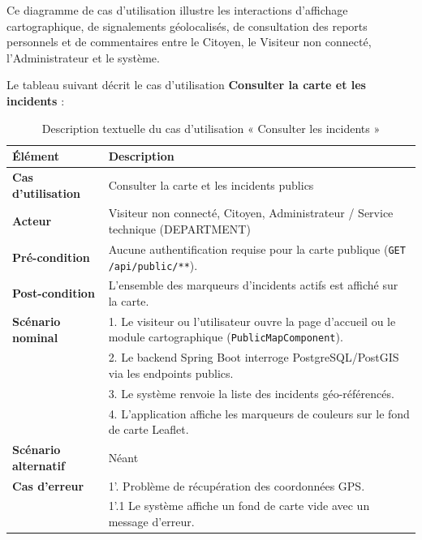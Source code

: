 Ce diagramme de cas d'utilisation illustre les interactions d'affichage cartographique, de signalements géolocalisés, de consultation des reports personnels et de commentaires entre le Citoyen, le Visiteur non connecté, l'Administrateur et le système.

Le tableau suivant décrit le cas d'utilisation \textbf{\og Consulter la carte et les incidents \fg{}} :

\begin{table}[H]
    \centering
    \caption{Description textuelle du cas d'utilisation « Consulter les incidents »}
    \label{tab:txt_cons_offres}
    \vspace{0.2cm}
    \small
    \begin{tabularx}{\textwidth}{|l|X|}
        \hline
        \textbf{Élément} & \textbf{Description} \\ \hline
        \textbf{Cas d’utilisation} & Consulter la carte et les incidents publics \\ \hline
        \textbf{Acteur} & Visiteur non connecté, Citoyen, Administrateur / Service technique (DEPARTMENT) \\ \hline
        \textbf{Pré-condition} & Aucune authentification requise pour la carte publique (\texttt{GET /api/public/**}). \\ \hline
        \textbf{Post-condition} & L'ensemble des marqueurs d'incidents actifs est affiché sur la carte. \\ \hline
        \textbf{Scénario nominal} &
        1. Le visiteur ou l'utilisateur ouvre la page d'accueil ou le module cartographique (\texttt{PublicMapComponent}).\\
        & 2. Le backend Spring Boot interroge PostgreSQL/PostGIS via les endpoints publics.\\
        & 3. Le système renvoie la liste des incidents géo-référencés.\\
        & 4. L'application affiche les marqueurs de couleurs sur le fond de carte Leaflet. \\ \hline
        \textbf{Scénario alternatif} & Néant \\ \hline
        \textbf{Cas d’erreur} &
        1'. Problème de récupération des coordonnées GPS.\\
        & 1'.1 Le système affiche un fond de carte vide avec un message d'erreur. \\ \hline
    \end{tabularx}
\end{table}

